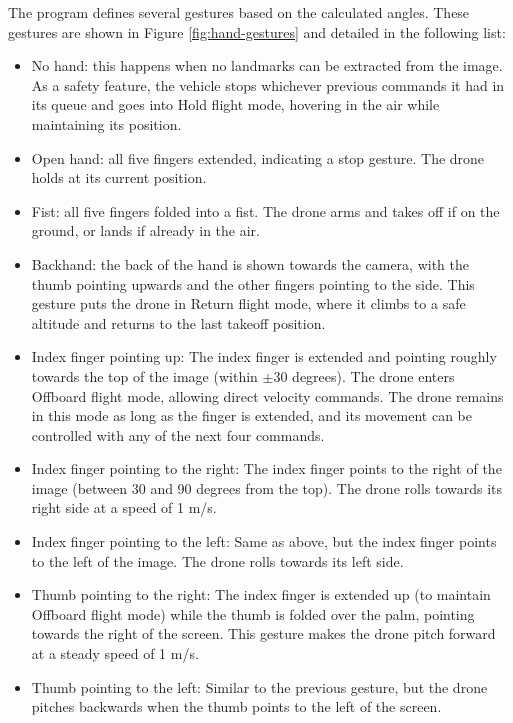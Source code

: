 The program defines several gestures based on the calculated angles. These gestures are shown in Figure \ref{fig:hand-gestures} and detailed in the following list:
\begin{itemize}
    \item No hand: this happens when no landmarks can be extracted from the image. As a safety feature, the vehicle stops whichever previous commands it had in its queue and goes into Hold flight mode, hovering in the air while maintaining its position.
    \item Open hand: all five fingers extended, indicating a stop gesture. The drone holds at its current position.
    \item Fist: all five fingers folded into a fist. The drone arms and takes off if on the ground, or lands if already in the air.
    \item Backhand: the back of the hand is shown towards the camera, with the thumb pointing upwards and the other fingers pointing to the side. This gesture puts the drone in Return flight mode, where it climbs to a safe altitude and returns to the last takeoff position.
    \item Index finger pointing up: The index finger is extended and pointing roughly towards the top of the image (within $\pm$30 degrees). The drone enters Offboard flight mode, allowing direct velocity commands. The drone remains in this mode as long as the finger is extended, and its movement can be controlled with any of the next four commands.
    \item Index finger pointing to the right: The index finger points to the right of the image (between 30 and 90 degrees from the top). The drone rolls towards its right side at a speed of 1 m/s.
    \item Index finger pointing to the left: Same as above, but the index finger points to the left of the image. The drone rolls towards its left side.
    \item Thumb pointing to the right: The index finger is extended up (to maintain Offboard flight mode) while the thumb is folded over the palm, pointing towards the right of the screen. This gesture makes the drone pitch forward at a steady speed of 1 m/s.
    \item Thumb pointing to the left: Similar to the previous gesture, but the drone pitches backwards when the thumb points to the left of the screen.
\end{itemize}

